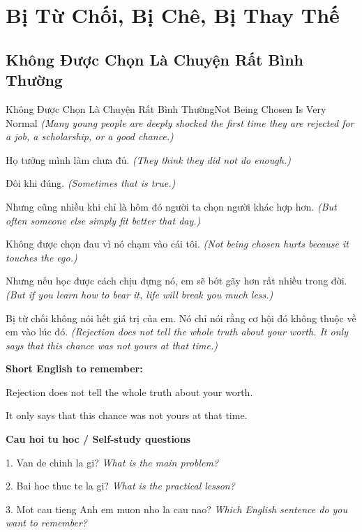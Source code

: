 \chapter{Bị Từ Chối, Bị Chê, Bị Thay Thế}

\section{Không Được Chọn Là Chuyện Rất Bình Thường}
\begin{truyen}{Không Được Chọn Là Chuyện Rất Bình Thường}{Not Being Chosen Is Very Normal}
\textit{(Many young people are deeply shocked the first time they are rejected for a job, a scholarship, or a good chance.)}

Họ tưởng mình làm chưa đủ.
\textit{(They think they did not do enough.)}

Đôi khi đúng.
\textit{(Sometimes that is true.)}

Nhưng cũng nhiều khi chỉ là hôm đó người ta chọn người khác hợp hơn.
\textit{(But often someone else simply fit better that day.)}

Không được chọn đau vì nó chạm vào cái tôi.
\textit{(Not being chosen hurts because it touches the ego.)}

Nhưng nếu học được cách chịu đựng nó, em sẽ bớt gãy hơn rất nhiều trong đời.
\textit{(But if you learn how to bear it, life will break you much less.)}

\end{truyen}

\begin{baihoc}
Bị từ chối không nói hết giá trị của em. Nó chỉ nói rằng cơ hội đó không thuộc về em vào lúc đó.
\textit{(Rejection does not tell the whole truth about your worth. It only says that this chance was not yours at that time.)}
\end{baihoc}

\begin{ghinhoanh}
\textbf{Short English to remember:}

Rejection does not tell the whole truth about your worth.

It only says that this chance was not yours at that time.

\end{ghinhoanh}

\begin{tuhocnhanh}
\textbf{Cau hoi tu hoc / Self-study questions}

1. Van de chinh la gi? \textit{What is the main problem?}

2. Bai hoc thuc te la gi? \textit{What is the practical lesson?}

3. Mot cau tieng Anh em muon nho la cau nao? \textit{Which English sentence do you want to remember?}
\end{tuhocnhanh}
\ngancach

